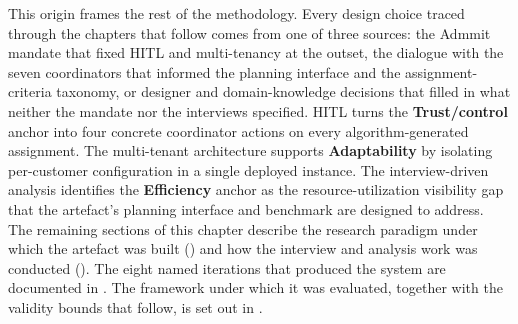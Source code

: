 This origin frames the rest of the methodology. Every design choice traced through the chapters that follow comes from one of three sources: the Admmit mandate that fixed HITL and multi-tenancy at the outset, the dialogue with the seven coordinators that informed the planning interface and the assignment-criteria taxonomy, or designer and domain-knowledge decisions that filled in what neither the mandate nor the interviews specified. HITL turns the \textbf{Trust/control} anchor into four concrete coordinator actions on every algorithm-generated assignment. The multi-tenant architecture supports \textbf{Adaptability} by isolating per-customer configuration in a single deployed instance. The interview-driven analysis identifies the \textbf{Efficiency} anchor as the resource-utilization visibility gap that the artefact's planning interface and benchmark are designed to address. The remaining sections of this chapter describe the research paradigm under which the artefact was built () and how the interview and analysis work was conducted (). The eight named iterations that produced the system are documented in . The framework under which it was evaluated, together with the validity bounds that follow, is set out in .


